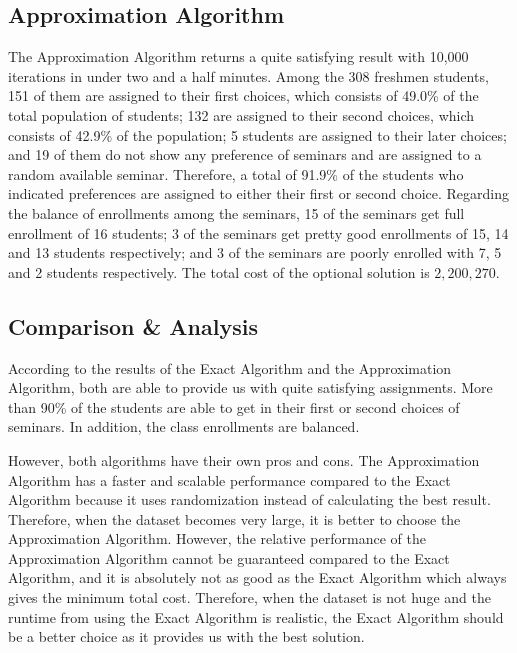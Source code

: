 \documentclass{article} %
\begin{document}
\subsection{Approximation Algorithm}
\par\qquad The Approximation Algorithm returns a quite satisfying result with 10,000 iterations in under two and a half minutes. Among the 308 freshmen students, 151 of them are assigned to their first choices, which consists of 49.0\% of the total population of students; 132 are assigned to their second choices, which consists of 42.9\% of the population; 5 students are assigned to their later choices; and 19 of them do not show any preference of seminars and are assigned to a random available seminar. Therefore, a total of 91.9\% of the students who indicated preferences are assigned to either their first or second choice. Regarding the balance of enrollments among the seminars, 15 of the seminars get full enrollment of 16 students; 3 of the seminars get pretty good enrollments of 15, 14 and 13 students respectively; and 3 of the seminars are poorly enrolled with 7, 5 and 2 students respectively. The total cost of the optional solution is $2,200,270$.

\subsection{Comparison \& Analysis}

\par\qquad According to the results of the Exact Algorithm and the Approximation Algorithm, both are able to provide us with quite satisfying assignments. More than 90\% of the students are able to get in their first or second choices of seminars. In addition, the class enrollments are balanced. 

\par\qquad However, both algorithms have their own pros and cons. The Approximation Algorithm has a faster and scalable performance compared to the Exact Algorithm because it uses randomization instead of calculating the best result. Therefore, when the dataset becomes very large, it is better to choose the Approximation Algorithm. However, the relative performance of the Approximation Algorithm cannot be guaranteed compared to the Exact Algorithm, and it is absolutely not as good as the Exact Algorithm which always gives the minimum total cost. Therefore, when the dataset is not huge and the runtime from using the Exact Algorithm is realistic, the Exact Algorithm should be a better choice as it provides us with the best solution.
\end{document}
